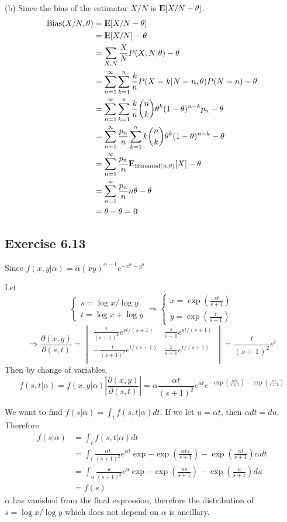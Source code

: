 \documentclass[12pt]{article}
\begin{document}
(b) Since the bias of the estimator $X/N$ is ${\rm I\kern-.3em E} [X/N - \theta]$. 
$$ 
\begin{aligned}
  \mbox{Bias}(X/N, \theta) &= {\rm I\kern-.3em E}[X/N - \theta] \\
        &= {\rm I\kern-.3em E}[X/N] - \theta \\
        &= \sum_{X, N} \frac{X}{N}P(X, N|\theta)  - \theta \\ 
        &= \sum_{n=1}^\infty \sum_{k=1}^n \frac{k}{n}P(X=k|N=n, \theta)P(N=n) - \theta \\
        &= \sum_{n=1}^\infty \sum_{k=1}^n \frac{k}{n} {n \choose k} \theta^k (1- \theta)^{n-k} p_n - \theta \\
        &= \sum_{n=1}^\infty  \frac{p_n}{n} \sum_{k=1}^n k {n \choose k} \theta^k (1- \theta)^{n-k} - \theta \\
        &= \sum_{n=1}^\infty  \frac{p_n}{n} {\rm I\kern-.3em E}_{\mathrm{Binomial}(n, \theta)}[X]  - \theta \\
        &=  \sum_{n=1}^\infty  \frac{p_n}{n} n\theta - \theta \\
        &= \theta - \theta = 0 
\end{aligned}
$$

\subsection*{Exercise 6.13}
Since $f(x, y|\alpha) = \alpha (xy)^{\alpha - 1}e^{-x^{\alpha} - y^{\alpha}}$

Let $$ \begin{cases}
	s = \log x / \log y \\
	t = \log x + \log y
\end{cases}
\Rightarrow
 \begin{cases}
	x = \exp(\frac{st}{s+1}) \\
	y = \exp(\frac{t}{s+1})
\end{cases}
$$
$$
\Rightarrow
\frac{\partial(x,y)}{\partial(s,t)} =
\begin{vmatrix}
	\frac{t}{(s+1)^2}e^{st/(s+1)}  &  \frac{s}{s+1}e^{st/(s+1)}  \\
	-\frac{t}{(s+1)^2}e^{t/(s+1)} & \frac{1}{s+1}e^{t/(s+1)} \\
\end{vmatrix}
= \frac{t}{(s+1)^2}e^t
$$
Then by change of variables, $$
f(s, t|\alpha) = f(x, y|\alpha)\left|\frac{\partial(x,y)}{\partial(s,t)}\right| = \alpha \frac{\alpha t}{(s+1)^2} e^{\alpha t} e^{-\exp(\frac{\alpha t s}{s+1}) - \exp(\frac{\alpha t} {s+1})} 
$$

We want to find $f(s|\alpha) = \int_t f(s, t|\alpha) dt$. If we let $u = \alpha t$, then $\alpha dt = du$. Therefore
$$
\begin{aligned}
	f(s|\alpha) &= \int_t f(s, t|\alpha) dt \\
	&= \int_t  \frac{\alpha t}{(s+1)^2} e^{\alpha t} \exp{-\exp(\frac{\alpha t s}{s+1}) - \exp(\frac{\alpha t} {s+1})} \alpha dt \\
	&= \int_u  \frac{u}{(s+1)^2} e^{u} \exp{-\exp(\frac{u s}{s+1}) - \exp(\frac{u} {s+1})} du \\
	&= f(s)
\end{aligned}
$$
$\alpha$ has vanished from the final expression, therefore the distribution of $s=\log x / \log y$ which does not depend on $\alpha$ is ancillary.
\end{document}
